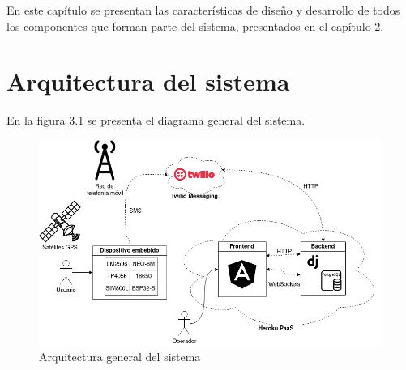 {En este capítulo se presentan las características de diseño y desarrollo de todos los componentes que forman parte del sistema, presentados en el capítulo 2.

\section{Arquitectura del sistema}

En la figura 3.1 se presenta el diagrama general del sistema.

\begin{figure}[H]
	\centering
	\includegraphics[width=1\textwidth]{./Figures/arquitectura.png}
	\caption{Arquitectura general del sistema}
	\label{fig:texmaker}
\end{figure}


}

